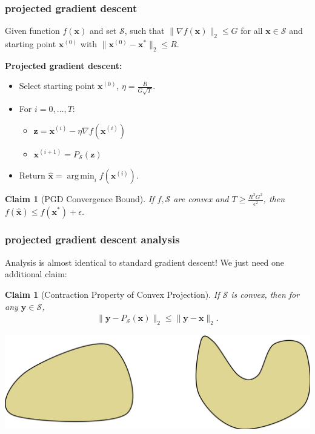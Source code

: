 \documentclass[compress]{beamer}
\newcommand{\bv}[1]{\mathbf{#1}}
\DeclareMathOperator*{\argmin}{arg\,min}
\newtheorem{claim}[theorem]{Claim}
\begin{document}
\begin{frame}[t]
	\frametitle{projected gradient descent}
	Given function $f(\bv{x})$ and set $\mathcal{S}$, such that $\|\nabla f(\bv{x})\|_2 \leq G$ for all $\bv{x}\in \mathcal{S}$ and starting point $\bv{x}^{(0)}$ with $\|\bv{x}^{(0)} - \bv{x}^*\|_2 \leq R$.  
	
	\textbf{Projected gradient descent:}
	\begin{itemize}
		\item Select starting point $\bv{x}^{(0)}$, $\eta = \frac{R}{G\sqrt{T}}$. 
		\item For $i = 0,\ldots, T$:
		\begin{itemize}
			\item $\bv{z} = \bv{x}^{(i)} - \eta \nabla f(\bv{x}^{(i)})$
			\item $\bv{x}^{(i+1)} = P_\mathcal{S}(\bv{z})$
		\end{itemize}
		\item Return $\hat{\bv{x}} = \argmin_{i} f(\bv{x}^{(i)})$.
	\end{itemize}
\begin{claim}[PGD Convergence Bound]
	If $f, \mathcal{S}$ are convex and $T \geq \frac{R^2G^2}{\epsilon^2}$, then $f(\hat{\bv{x}}) \leq f(\bv{x}^*) + \epsilon$.
\end{claim}
\end{frame}

\begin{frame}[t]
	\frametitle{projected gradient descent analysis}
	Analysis is almost identical to standard gradient descent! We just need one additional claim:
	
	\begin{claim}[Contraction Property of Convex Projection]
		If $\mathcal{S}$ is convex, then for \emph{any} $\bv{y} \in \mathcal{S}$,
		\begin{align*}
			\|\bv{y} - P_\mathcal{S}(\bv{x})\|_2 \leq \|\bv{y} - \bv{x}\|_2.
		\end{align*}
	\end{claim}
\vspace{-1em}
\begin{center}
	\includegraphics[width=.8\textwidth]{sets.png}
\end{center}	
\end{frame}
\end{document}

